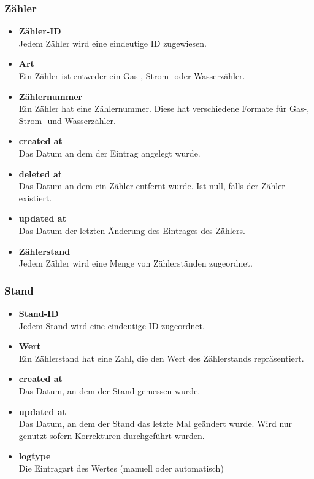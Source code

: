 \subsubsection*{Zähler}
	\begin{itemize}
	    \item \textbf{Zähler-ID}\hfill\\
	    Jedem Zähler wird eine eindeutige ID zugewiesen.
		\item \textbf{Art}\hfill \\
		Ein Zähler ist entweder ein Gas-, Strom- oder Wasserzähler.
		\item \textbf{Zählernummer}\hfill \\
		Ein Zähler hat eine Zählernummer. Diese hat verschiedene Formate für Gas-, Strom- und Wasserzähler.
		\item \textbf{created at}\hfill \\
		Das Datum an dem der Eintrag angelegt wurde.
		\item \textbf{deleted at}\hfill \\
		Das Datum an dem ein Zähler entfernt wurde. Ist null, falls der Zähler existiert.
		\item \textbf{updated at}\hfill \\
		Das Datum der letzten Änderung des Eintrages des Zählers.
		\item \textbf{Zählerstand}\hfill\\
		Jedem Zähler wird eine Menge von Zählerständen zugeordnet.
	\end{itemize}
\subsubsection*{Stand}
	\begin{itemize}
	    \item \textbf{Stand-ID}\hfill\\
	    Jedem Stand wird eine eindeutige ID zugeordnet.
		\item \textbf{Wert}\hfill \\
		Ein Zählerstand hat eine Zahl, die den Wert des Zählerstands repräsentiert.
		\item \textbf{created at}\hfill \\
		Das Datum, an dem der Stand gemessen wurde.
		\item \textbf{updated at}\hfill \\
		Das Datum, an dem der Stand das letzte Mal geändert wurde. Wird nur genutzt sofern Korrekturen durchgeführt wurden.
		\item \textbf{logtype}\hfill \\
		Die Eintragart des Wertes (manuell oder automatisch)
	\end{itemize}
